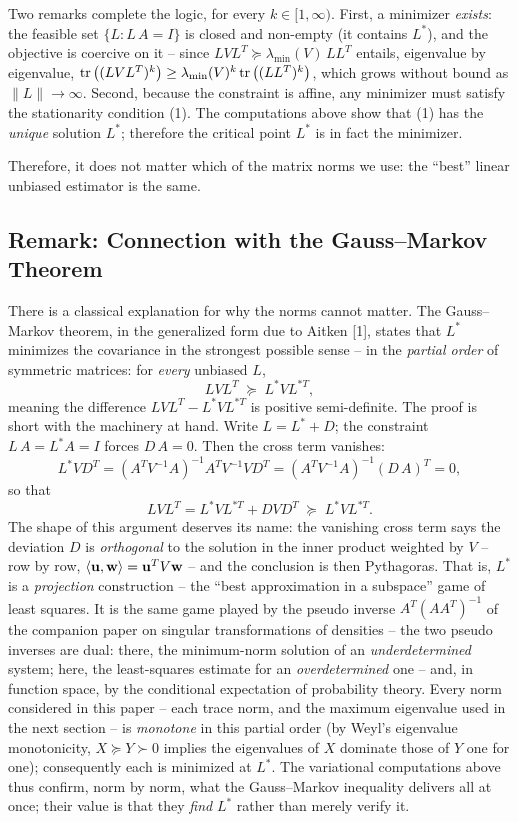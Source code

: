 Two remarks complete the logic, for every $k \in [1, \infty)$. First, a
minimizer {\it exists\/}: the feasible set $\{L : L\,A = I\}$ is closed and
non-empty (it contains $L^*$), and the objective is coercive on it --
since $LVL^T \succeq \lambda_{\min}(V)\, L L^T$ entails, eigenvalue by
eigenvalue,
${\rm tr}\left((LVL^T)^k\right) \ge \lambda_{\min}(V)^k \,
{\rm tr}\left((LL^T)^k\right)$, which grows without bound as
$\|L\| \rightarrow \infty$. Second, because the constraint is affine, any
minimizer must satisfy the stationarity condition (1). The computations
above show that (1) has the {\it unique\/} solution $L^*$; therefore the
critical point $L^*$ is in fact the minimizer.

Therefore, it does not matter which of the matrix norms we
use: the ``best'' linear unbiased estimator is the same.

\subsection{Remark: Connection with the Gauss--Markov Theorem}
There is a classical explanation for why the norms cannot matter. The
Gauss--Markov theorem, in the generalized form due to Aitken [1], states
that $L^*$ minimizes the covariance in the strongest possible sense -- in
the {\it partial order\/} of symmetric matrices: for {\it every\/} unbiased
$L$,
$$
L V L^T \; \succeq \; L^* V L^{*T},
$$
meaning the difference $LVL^T - L^*VL^{*T}$ is positive semi-definite.
The proof is short with the machinery at hand. Write $L = L^* + D$; the
constraint $L\,A = L^*A = I$ forces $D\,A = 0$. Then the cross term
vanishes:
$$
L^* V D^T = (A^TV^{-1}A)^{-1}A^TV^{-1} V D^T
          = (A^TV^{-1}A)^{-1}(D\,A)^T = 0,
$$
so that
$$
L V L^T = L^* V L^{*T} + D V D^T \; \succeq \; L^* V L^{*T}.
$$
The shape of this argument deserves its name: the vanishing cross term
says the deviation $D$ is {\it orthogonal\/} to the solution in the inner
product weighted by $V$ -- row by row,
$\langle {\bf u}, {\bf w} \rangle = {\bf u}^T V {\bf w}$ -- and the
conclusion is then Pythagoras.
That is, $L^*$ is a {\it projection\/} construction -- the ``best
approximation in a subspace'' game of least squares. It is the same game
played by the pseudo inverse $A^T(AA^T)^{-1}$ of the companion paper on
singular transformations of densities -- the two pseudo inverses are
dual: there, the minimum-norm solution of an {\it underdetermined\/}
system; here, the least-squares estimate for an {\it overdetermined\/}
one -- and, in function space, by the conditional expectation of
probability theory.
Every norm considered in this paper -- each trace norm, and the maximum
eigenvalue used in the next section -- is {\it monotone\/} in this partial
order (by Weyl's eigenvalue monotonicity, $X \succeq Y \succ 0$ implies the
eigenvalues of $X$ dominate those of $Y$ one for one); consequently each is
minimized at $L^*$. The variational computations above thus confirm, norm
by norm, what the Gauss--Markov inequality delivers all at once; their
value is that they {\it find\/} $L^*$ rather than merely verify it.

